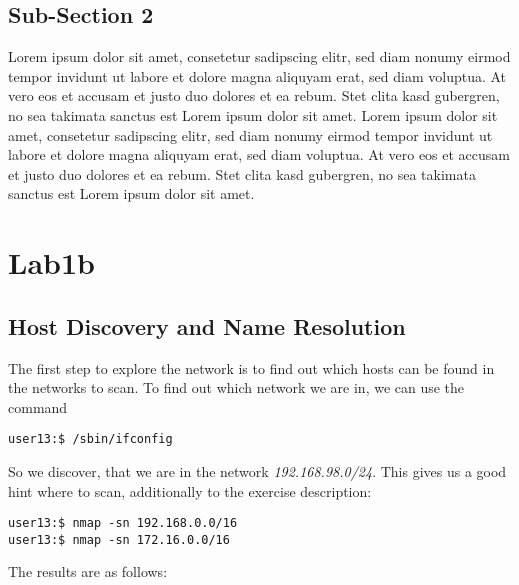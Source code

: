 \documentclass[12pt,a4paper,titlepage,oneside]{scrartcl}
\begin{document}
\subsection{Sub-Section 2}
Lorem ipsum dolor sit amet, consetetur sadipscing elitr, sed diam nonumy eirmod tempor invidunt ut labore et dolore magna aliquyam erat, sed diam voluptua. At vero eos et accusam et justo duo dolores et ea rebum. Stet clita kasd gubergren, no sea takimata sanctus est Lorem ipsum dolor sit amet. Lorem ipsum dolor sit amet, consetetur sadipscing elitr, sed diam nonumy eirmod tempor invidunt ut labore et dolore magna aliquyam erat, sed diam voluptua. At vero eos et accusam et justo duo dolores et ea rebum. Stet clita kasd gubergren, no sea takimata sanctus est Lorem ipsum dolor sit amet.

\section{Lab1b}

\subsection{Host Discovery and Name Resolution}
The first step to explore the network is to find out which hosts can be found in the networks to scan. To find out which network we are in, we can use the command

\begin{lstlisting}[style=simple]
user13:$ /sbin/ifconfig 
\end{lstlisting}

So we discover, that we are in the network \emph{192.168.98.0/24}. This gives us a good hint where to scan, additionally to the exercise description:

\begin{lstlisting}[style=simple]
user13:$ nmap -sn 192.168.0.0/16
user13:$ nmap -sn 172.16.0.0/16
\end{lstlisting}

The results are as follows:
\end{document}
